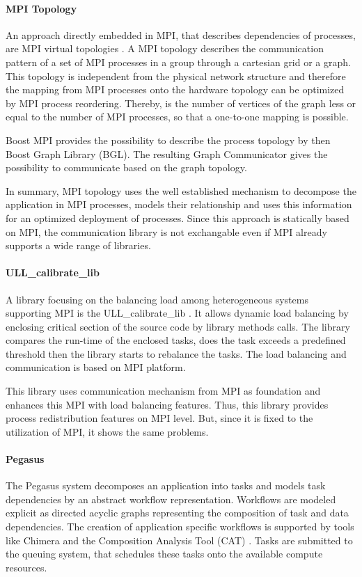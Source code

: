 \paragraph*{MPI Topology}
An approach directly embedded in MPI, that describes dependencies of
processes, are MPI virtual topologies \cite{ref:mpi_topology}. A MPI
topology describes the communication pattern of a set of MPI processes
in a group through a cartesian grid or a graph.  This topology is
independent from the physical network structure and therefore the
mapping from MPI processes onto the hardware topology can be optimized
by MPI process reordering. Thereby, is the number of vertices of the
graph less or equal to the number of MPI processes, so that a
one-to-one mapping is possible.

Boost MPI provides the possibility to describe the process topology by
then Boost Graph Library (BGL)\cite{ref:boost_bgl}.  The resulting
Graph Communicator \cite{ref:boost_graph_communicator} gives the
possibility to communicate based on the graph topology.

In summary, MPI topology uses the well established mechanism to
decompose the application in MPI processes, models their relationship
and uses this information for an optimized deployment of processes.
Since this approach is statically based on MPI, the communication
library is not exchangable even if MPI already supports a wide range
of libraries.

\paragraph*{ULL\_calibrate\_lib}
A library focusing on the balancing load among heterogeneous systems
supporting MPI is the ULL\_calibrate\_lib
\cite{ref:ull_calibrate_lib}. It allows dynamic load balancing by
enclosing critical section of the source code by library methods
calls. The library compares the run-time of the enclosed tasks, does
the task exceeds a predefined threshold then the library starts to
rebalance the tasks. The load balancing and communication is based on
MPI platform.

This library uses communication mechanism from MPI as foundation and
enhances this MPI with load balancing features. Thus, this library
provides process redistribution features on MPI level. But, since it
is fixed to the utilization of MPI, it shows the same problems.

\paragraph*{Pegasus}
The Pegasus system \cite{ref:pegasus} decomposes an application into
tasks and models task dependencies by an abstract workflow
representation. Workflows are modeled explicit as directed
acyclic graphs representing the composition of task and data
dependencies. The creation of application specific workflows is
supported by tools like Chimera \cite{ref:chimera} and the Composition
Analysis Tool (CAT) \cite{ref:cat}.  Tasks are submitted to the
queuing system, that schedules these tasks onto the available compute
resources.

